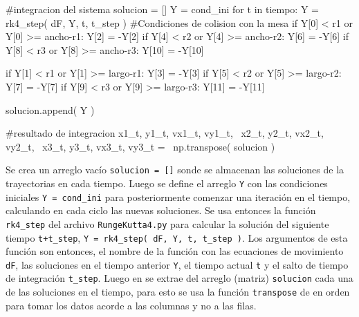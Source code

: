 \begin{listing}[style=python, numbers = none]
#integracion del sistema
solucion = []
Y = cond_ini
for t in tiempo:
    Y = rk4_step( dF, Y, t, t_step )
    #Condiciones de colision con la mesa
    if Y[0] < r1 or Y[0] >= ancho-r1:
	Y[2] = -Y[2]
    if Y[4] < r2 or Y[4] >= ancho-r2:
	Y[6] = -Y[6]
    if Y[8] < r3 or Y[8] >= ancho-r3:
	Y[10] = -Y[10]
	
    if Y[1] < r1 or Y[1] >= largo-r1:
	Y[3] = -Y[3]
    if Y[5] < r2 or Y[5] >= largo-r2:
	Y[7] = -Y[7]
    if Y[9] < r3 or Y[9] >= largo-r3:
	Y[11] = -Y[11]

    solucion.append( Y )

#resultado de integracion
x1_t, y1_t, vx1_t, vy1_t, \
x2_t, y2_t, vx2_t, vy2_t, \
x3_t, y3_t, vx3_t, vy3_t = \
np.transpose( solucion )
\end{listing}
Se crea un arreglo vacío \texttt{solucion = []} sonde se almacenan las 
soluciones de la trayectorias en cada tiempo. Luego se define el arreglo 
\texttt{Y} con las condiciones iniciales \texttt{Y = cond\_ini} para 
posteriormente comenzar una iteración en el tiempo, calculando en cada ciclo
las nuevas soluciones. Se usa entonces la función \texttt{rk4\_step} del 
archivo \texttt{RungeKutta4.py} para calcular la solución del siguiente 
tiempo \texttt{t+t\_step}, \texttt{Y = rk4\_step( dF, Y, t, t\_step )}. 
Los argumentos de esta función son entonces, el nombre de la función con 
las ecuaciones de movimiento \texttt{dF}, las soluciones en el tiempo 
anterior \texttt{Y}, el tiempo actual \texttt{t} y el salto de tiempo de 
integración \texttt{t\_step}. Luego en se extrae del arreglo (matriz) 
\texttt{solucion} cada una de las soluciones en el tiempo, para esto se
usa la función \texttt{transpose} de \numpy en orden para tomar los datos 
acorde a las columnas y no a las filas.



